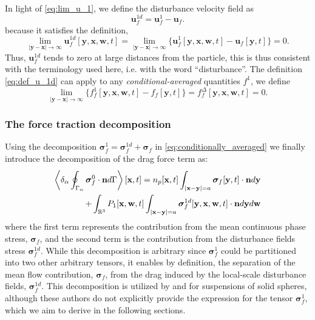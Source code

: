 In light of \ref{eq:lim_u_1}, we define the disturbance velocity field as 
\begin{equation}
    \textbf{u}_f^{1d}
    =
    \textbf{u}_f^1 
    - 
    \textbf{u}_f. 
    \label{eq:def_u_1d}
\end{equation}
because it satisfies the definition, 
\begin{equation}
    \lim_{|\textbf{y}-\textbf{x}|\to\infty} 
    \textbf{u}_f^{1d}[\textbf{y},\textbf{x},\textbf{w},t]
    =
    \lim_{|\textbf{y}-\textbf{x}|\to\infty} 
    \{\textbf{u}_f^1[\textbf{y},\textbf{x},\textbf{w},t]
    - \textbf{u}_f[\textbf{y},t]\}
    = 0.
    \label{eq:lim_u_1d}
\end{equation} 
Thus, $\textbf{u}_f^{1d}$ tends to zero at large distances from the particle, this is thus consistent with the terminology used here, i.e. with the word ``disturbance''.
The definition \ref{eq:def_u_1d} can apply to any \textit{conditional-averaged} quantities $f^1$, we define
\begin{equation}
    \lim_{|\textbf{y}-\textbf{x}|\to\infty} 
    \{f_f^1[\textbf{y},\textbf{x},\textbf{w},t]
    - f_f[\textbf{y},t]\}
    =
    f_f^{\Delta}[\textbf{y},\textbf{x},\textbf{w},t]
    = 0.
\end{equation} 

\subsubsection{The force traction decomposition}

Using the decomposition $\bm\sigma_f^1 = \bm\sigma_f^{1d} + \bm\sigma_f$ in \ref{eq:conditionally_averaged} we finally introduce the decomposition of the drag force term as:  
\begin{align}
    \pSavg{\bm\sigma_f^0\cdot\textbf{n}}[\textbf{x},t]
    =
    n_p[\textbf{x},t]
    \int_{|\textbf{x}-\textbf{y}|=a}
    \bm\sigma_f[\textbf{y},t]
    \cdot \textbf{n}
    d\textbf{y}\\
    + 
    \int_{\mathbb{R}^3}
    P_1[\textbf{x},\textbf{w},t]
    \int_{|\textbf{x}-\textbf{y}|=a}
    \bm\sigma_f^{1d}[\textbf{y},\textbf{x},\textbf{w},t]
    \cdot \textbf{n}
    d\textbf{y}
    d\textbf{w}
    \label{eq:general_partition}
\end{align}
where the first term represents the contribution from the mean continuous phase stress, $\bm\sigma_f$, and the second term is the contribution from the disturbance fields stress $\bm\sigma_f^{1d}$. 
While this decomposition is arbitrary since $\bm\sigma_f^1$ could be partitioned into two other arbitrary tensors, it enables by definition, the separation of the mean flow contribution, $\bm\sigma_f$, from the drag induced by the local-scale disturbance fields, $\bm\sigma_f^{1d}$.
This decomposition is utilized by \citet[Chapter 2]{jackson2000} and \citet{zhang1997momentum,wang2021numerical,wang2024effect} for suspensions of solid spheres, although these authors do not explicitly provide the expression for the tensor $\bm\sigma_f^1$, which we aim to derive in the following sections. 

